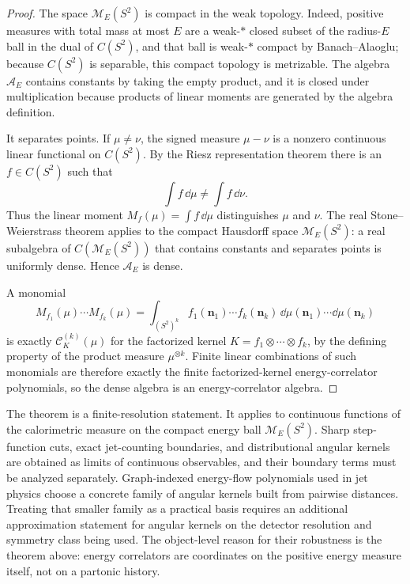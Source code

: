 \begin{proof}
The space \(\mathcal M_E(S^2)\) is compact in the weak topology.  Indeed,
positive measures with total mass at most \(E\) are a weak-\(*\) closed
subset of the radius-\(E\) ball in the dual of \(C(S^2)\), and that ball is
weak-\(*\) compact by Banach--Alaoglu; because \(C(S^2)\) is separable, this
compact topology is metrizable.  The algebra \(\mathcal A_E\) contains
constants by taking the empty product, and it is closed under multiplication
because products of linear moments are generated by the algebra definition.

It separates points.  If \(\mu\ne\nu\), the signed measure \(\mu-\nu\) is a
nonzero continuous linear functional on \(C(S^2)\).  By the Riesz
representation theorem there is an \(f\in C(S^2)\) such that
\[
  \int f\,\dd\mu\ne\int f\,\dd\nu .
\]
Thus the linear moment \(M_f(\mu)=\int f\,\dd\mu\) distinguishes \(\mu\) and
\(\nu\).  The real Stone--Weierstrass theorem applies to the compact
Hausdorff space \(\mathcal M_E(S^2)\): a real subalgebra of
\(C(\mathcal M_E(S^2))\) that contains constants and separates points is
uniformly dense.  Hence \(\mathcal A_E\) is dense.

A monomial
\[
  M_{f_1}(\mu)\cdots M_{f_k}(\mu)
  =
  \int_{(S^2)^k}
  f_1(\mathbf n_1)\cdots f_k(\mathbf n_k)\,
  \dd\mu(\mathbf n_1)\cdots\dd\mu(\mathbf n_k)
\]
is exactly \(\mathcal C_K^{(k)}(\mu)\) for the factorized kernel
\(K=f_1\otimes\cdots\otimes f_k\), by the defining property of the product
measure \(\mu^{\otimes k}\).  Finite linear combinations of such monomials
are therefore exactly the finite factorized-kernel energy-correlator
polynomials, so the dense algebra is an energy-correlator algebra.
\end{proof}

The theorem is a finite-resolution statement.  It applies to continuous
functions of the calorimetric measure on the compact energy ball
\(\mathcal M_E(S^2)\).  Sharp step-function cuts, exact jet-counting
boundaries, and distributional angular kernels are obtained as limits of
continuous observables, and their boundary terms must be analyzed separately.
Graph-indexed energy-flow polynomials used in jet physics choose a concrete
family of angular kernels built from pairwise distances.  Treating that
smaller family as a practical basis requires an additional approximation
statement for angular kernels on the detector resolution and symmetry class
being used.  The object-level reason for their robustness is the theorem
above: energy correlators are coordinates on the positive energy measure
itself, not on a partonic history.

